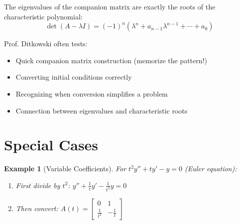\documentclass[12pt]{article}
\newtheorem{example}{Example}
\begin{document}
\begin{insight}
The eigenvalues of the companion matrix are exactly the roots of the characteristic polynomial:
$$\det(A - \lambda I) = (-1)^{n}(\lambda^{n} + a_{n-1}\lambda^{n-1} + \cdots + a_{0})$$
\end{insight}

\begin{examtip}
Prof. Ditkowski often tests:
\begin{itemize}
\item Quick companion matrix construction (memorize the pattern!)
\item Converting initial conditions correctly
\item Recognizing when conversion simplifies a problem
\item Connection between eigenvalues and characteristic roots
\end{itemize}
\end{examtip}

\section{Special Cases}

\begin{example}[Variable Coefficients]
For $t^{2}y'' + ty' - y = 0$ (Euler equation):
\begin{enumerate}
\item First divide by $t^{2}$: $y'' + \frac{1}{t}y' - \frac{1}{t^{2}}y = 0$
\item Then convert: $A(t) = \begin{bmatrix} 0 & 1 \\ \frac{1}{t^{2}} & -\frac{1}{t} \end{bmatrix}$
\end{enumerate}
\end{example}
\end{document}
